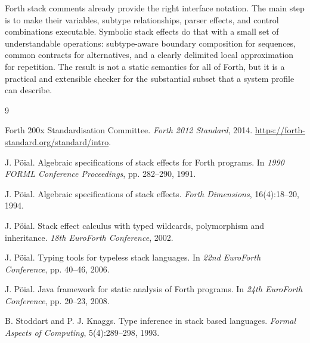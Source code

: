 \documentclass[10pt,a4paper]{article}
\begin{document}
Forth stack comments already provide the right interface notation.  The main
step is to make their variables, subtype relationships, parser effects, and
control combinations executable.  Symbolic stack effects do that with a small
set of understandable operations: subtype-aware boundary composition for
sequences, common contracts for alternatives, and a clearly delimited local
approximation for repetition.  The result is not a static semantics for all of
Forth, but it is a practical and extensible checker for the substantial subset
that a system profile can describe.

\begin{thebibliography}{9}
\small

Forth 200x Standardisation Committee.
\newblock \emph{Forth 2012 Standard}, 2014.
\newblock \url{https://forth-standard.org/standard/intro}.

J. Pöial.
\newblock Algebraic specifications of stack effects for Forth programs.
\newblock In \emph{1990 FORML Conference Proceedings}, pp. 282--290, 1991.

J. Pöial.
\newblock Algebraic specifications of stack effects.
\newblock \emph{Forth Dimensions}, 16(4):18--20, 1994.

J. Pöial.
\newblock Stack effect calculus with typed wildcards, polymorphism and
inheritance.
\newblock \emph{18th EuroForth Conference}, 2002.

J. Pöial.
\newblock Typing tools for typeless stack languages.
\newblock In \emph{22nd EuroForth Conference}, pp. 40--46, 2006.

J. Pöial.
\newblock Java framework for static analysis of Forth programs.
\newblock In \emph{24th EuroForth Conference}, pp. 20--23, 2008.

B. Stoddart and P. J. Knaggs.
\newblock Type inference in stack based languages.
\newblock \emph{Formal Aspects of Computing}, 5(4):289--298, 1993.

\end{thebibliography}
\end{document}
